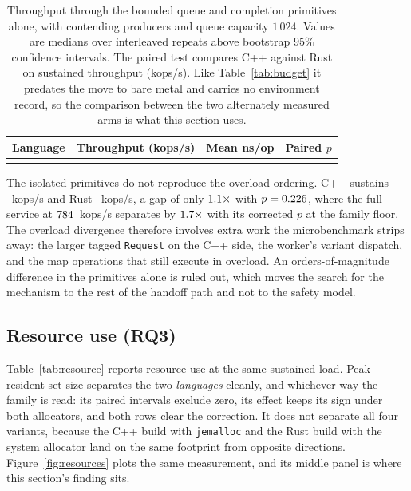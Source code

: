 \documentclass[english,oneside,a4paper,censored,csm,software-track-2020]{HYthesisML}
\begin{document}
\begin{table}[tp]
\centering
\small
\caption[Throughput through the contended synchronisation primitives alone]{Throughput through
the bounded queue and completion primitives alone, with \ContentionProducers{} contending producers
and queue capacity $1\,024$. Values are medians over \ContentionRepeats{} interleaved repeats above
bootstrap $95\%$ confidence intervals. The paired test compares C++ against Rust on sustained
throughput (kops/s). Like Table~\ref{tab:budget} it predates the move to bare metal and carries no
environment record, so the comparison between the two alternately measured arms is what this section
uses.\label{tab:contention}}
\begin{tabular}{@{}l r r r@{}}
\hline\hline
Language & Throughput (kops/s) & Mean ns/op & Paired $p$ \\
\hline
\\
\hline
\end{tabular}
\end{table}

The isolated primitives do not reproduce the overload ordering. C++ sustains
\ContentionThrCpp{}~kops/s and Rust \ContentionThrRust{}~kops/s, a gap of only
$1.1\times$ with $p = 0.226$, where the full service at
$784$~kops/s separates by $1.7\times$ with its corrected $p$ at the
family floor. The overload divergence therefore involves extra work the microbenchmark strips
away: the larger tagged \texttt{Request} on the C++ side, the worker's variant dispatch, and the
map operations that still execute in overload. An orders-of-magnitude difference in the
primitives alone is ruled out, which moves the search for the mechanism to the rest of the
handoff path and not to the safety model.

\subsection{Resource use (RQ3)}\label{sec:resources}
Table~\ref{tab:resource} reports resource use at the same sustained load. Peak resident set size
separates the two \emph{languages} cleanly, and whichever way the family is read: its paired
intervals exclude zero, its effect keeps its sign under both allocators, and both rows clear the
correction. It does not separate all four variants, because the C++ build with \texttt{jemalloc}
and the Rust build with the system allocator land on the same footprint from opposite directions.
Figure~\ref{fig:resources} plots the same measurement, and its middle panel is where this
section's finding sits.
\end{document}
